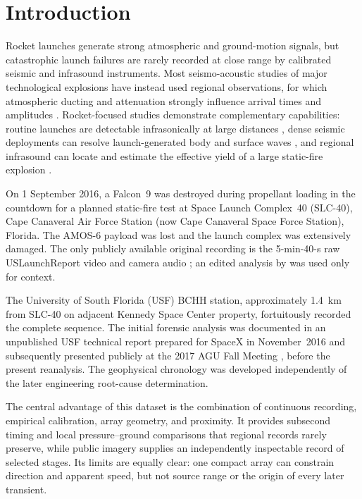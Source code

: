 \documentclass[]{seismica}
\begin{document}
\section{Introduction}
\label{sec:introduction}

Rocket launches generate strong atmospheric and ground-motion signals, but
catastrophic launch failures are rarely recorded at close range by calibrated
seismic and infrasound instruments. Most seismo-acoustic studies of major
technological explosions have instead used regional observations, for which
atmospheric ducting and attenuation strongly influence arrival times and
amplitudes \citep{ottemoller_2008,green_2008,ceranna_2009,smink_2019,
pilger_beirut_2021,kim_pasyanos_2022}. Rocket-focused studies demonstrate
complementary capabilities: routine launches are detectable infrasonically at
large distances \citep{pilger_rocket_2021}, dense seismic deployments can
resolve launch-generated body and surface waves
\citep{schuster_rocketquake_2025}, and regional infrasound can locate and
estimate the effective yield of a large static-fire explosion
\citep{silber_scamfer_newglenn_2026}.

On 1 September 2016, a Falcon~9 was destroyed during propellant loading in the
countdown for a planned static-fire test at Space Launch Complex~40 (SLC-40),
Cape Canaveral Air Force Station (now Cape Canaveral Space Force Station),
Florida. The AMOS-6 payload was lost and the launch complex was extensively
damaged. The only publicly available original recording is the 5-min-40-s raw
USLaunchReport video and camera audio \citep{uslaunchreport_amos6_video_2016};
an edited analysis by \citet{manley_spacex_explosion_2016} was used only for
context.

The University of South Florida (USF) BCHH station, approximately 1.4~km from
SLC-40 on adjacent Kennedy Space Center property, fortuitously recorded the
complete sequence. The initial forensic analysis was documented in an
unpublished USF technical report prepared for SpaceX in November~2016
\citep{thompson_mcnutt_fireball_2016} and subsequently presented publicly at
the 2017 AGU Fall Meeting \citep{thompson_agu_falcon9_2017}, before the
present reanalysis. The geophysical chronology was developed independently of
the later engineering root-cause determination.

The central advantage of this dataset is the combination of continuous
recording, empirical calibration, array geometry, and proximity. It provides
subsecond timing and local pressure--ground comparisons that regional records
rarely preserve, while public imagery supplies an independently inspectable
record of selected stages. Its limits are equally clear: one compact array can
constrain direction and apparent speed, but not source range or the origin of
every later transient.
\end{document}

